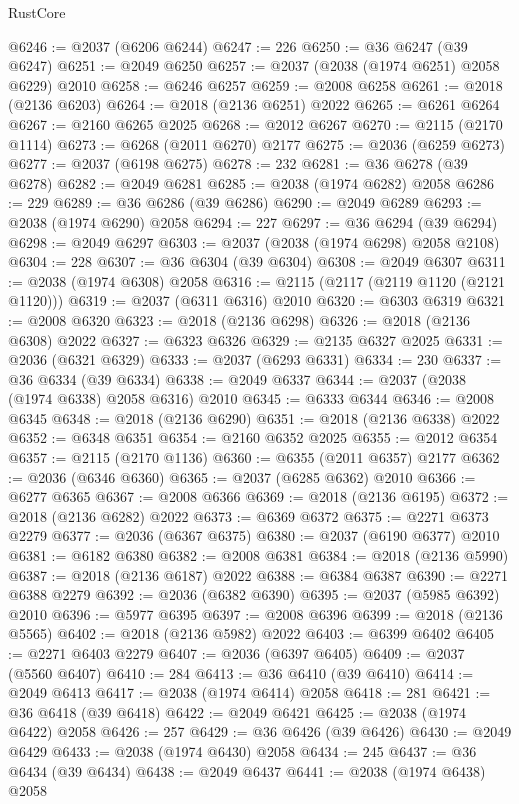 \begin{lexlean}{RustCore}
\begin{coremodule}
@6246 := @2037 (@6206 @6244)
@6247 := 226
@6250 := @36 @6247 (@39 @6247)
@6251 := @2049 @6250
@6257 := @2037 (@2038 (@1974 @6251) @2058 @6229) @2010
@6258 := @6246 @6257
@6259 := @2008 @6258
@6261 := @2018 (@2136 @6203)
@6264 := @2018 (@2136 @6251) @2022
@6265 := @6261 @6264
@6267 := @2160 @6265 @2025
@6268 := @2012 @6267
@6270 := @2115 (@2170 @1114)
@6273 := @6268 (@2011 @6270) @2177
@6275 := @2036 (@6259 @6273)
@6277 := @2037 (@6198 @6275)
@6278 := 232
@6281 := @36 @6278 (@39 @6278)
@6282 := @2049 @6281
@6285 := @2038 (@1974 @6282) @2058
@6286 := 229
@6289 := @36 @6286 (@39 @6286)
@6290 := @2049 @6289
@6293 := @2038 (@1974 @6290) @2058
@6294 := 227
@6297 := @36 @6294 (@39 @6294)
@6298 := @2049 @6297
@6303 := @2037 (@2038 (@1974 @6298) @2058 @2108)
@6304 := 228
@6307 := @36 @6304 (@39 @6304)
@6308 := @2049 @6307
@6311 := @2038 (@1974 @6308) @2058
@6316 := @2115 (@2117 (@2119 @1120 (@2121 @1120)))
@6319 := @2037 (@6311 @6316) @2010
@6320 := @6303 @6319
@6321 := @2008 @6320
@6323 := @2018 (@2136 @6298)
@6326 := @2018 (@2136 @6308) @2022
@6327 := @6323 @6326
@6329 := @2135 @6327 @2025
@6331 := @2036 (@6321 @6329)
@6333 := @2037 (@6293 @6331)
@6334 := 230
@6337 := @36 @6334 (@39 @6334)
@6338 := @2049 @6337
@6344 := @2037 (@2038 (@1974 @6338) @2058 @6316) @2010
@6345 := @6333 @6344
@6346 := @2008 @6345
@6348 := @2018 (@2136 @6290)
@6351 := @2018 (@2136 @6338) @2022
@6352 := @6348 @6351
@6354 := @2160 @6352 @2025
@6355 := @2012 @6354
@6357 := @2115 (@2170 @1136)
@6360 := @6355 (@2011 @6357) @2177
@6362 := @2036 (@6346 @6360)
@6365 := @2037 (@6285 @6362) @2010
@6366 := @6277 @6365
@6367 := @2008 @6366
@6369 := @2018 (@2136 @6195)
@6372 := @2018 (@2136 @6282) @2022
@6373 := @6369 @6372
@6375 := @2271 @6373 @2279
@6377 := @2036 (@6367 @6375)
@6380 := @2037 (@6190 @6377) @2010
@6381 := @6182 @6380
@6382 := @2008 @6381
@6384 := @2018 (@2136 @5990)
@6387 := @2018 (@2136 @6187) @2022
@6388 := @6384 @6387
@6390 := @2271 @6388 @2279
@6392 := @2036 (@6382 @6390)
@6395 := @2037 (@5985 @6392) @2010
@6396 := @5977 @6395
@6397 := @2008 @6396
@6399 := @2018 (@2136 @5565)
@6402 := @2018 (@2136 @5982) @2022
@6403 := @6399 @6402
@6405 := @2271 @6403 @2279
@6407 := @2036 (@6397 @6405)
@6409 := @2037 (@5560 @6407)
@6410 := 284
@6413 := @36 @6410 (@39 @6410)
@6414 := @2049 @6413
@6417 := @2038 (@1974 @6414) @2058
@6418 := 281
@6421 := @36 @6418 (@39 @6418)
@6422 := @2049 @6421
@6425 := @2038 (@1974 @6422) @2058
@6426 := 257
@6429 := @36 @6426 (@39 @6426)
@6430 := @2049 @6429
@6433 := @2038 (@1974 @6430) @2058
@6434 := 245
@6437 := @36 @6434 (@39 @6434)
@6438 := @2049 @6437
@6441 := @2038 (@1974 @6438) @2058

\end{coremodule}
\end{lexlean}
